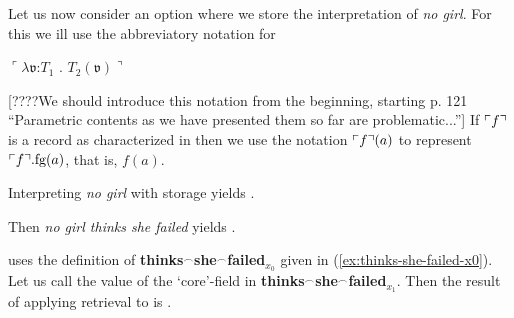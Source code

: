 Let us now consider an option where we store the interpretation of
\textit{no girl}.  For this we ill use the abbreviatory notation
 for 
\begin{ex} 
\begin{subex} 
 
\item {} 
 
\item $\ulcorner\lambda\mathfrak{v}$:$T_1$ . $T_2(\mathfrak{v})\urcorner$
 
\end{subex} 
   
\end{ex} 
[????We should introduce this notation from the beginning, starting
p. 121 ``Parametric contents as we have presented them so far are
problematic...''] If $\ulcorner f\urcorner$ is a record as
characterized in \preveg{} then we use the notation $\ulcorner f\urcorner(a)$ to
represent $\ulcorner f\urcorner.\text{fg}(a)$, that is, $f(a)$. 

Interpreting \textit{no girl} with storage yields \nexteg{}.
\begin{ex} 
\end{ex} 
Then \textit{no girl thinks she failed} yields \nexteg{}.
\begin{ex} 
\end{ex} 
\preveg{} uses the definition of
\textbf{thinks$^\frown$she$^\frown$failed$_{x_0}$} given in
(\ref{ex:thinks-she-failed-x0}).  Let us call the value of the
`core'-field in \preveg{}
\textbf{thinks$^\frown$she$^\frown$failed$_{x_1}$}.  Then the result
of applying retrieval to \preveg{} is \nexteg{}.
\begin{ex} 
\end{ex} 
     
